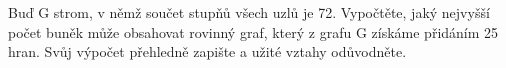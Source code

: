 Buď G strom, v němž součet stupňů všech uzlů je 72. Vypočtěte, jaký nejvyšší
počet buněk může obsahovat rovinný graf, který z grafu G získáme přidáním 25
hran. Svůj výpočet přehledně zapište a užité vztahy odůvodněte.
